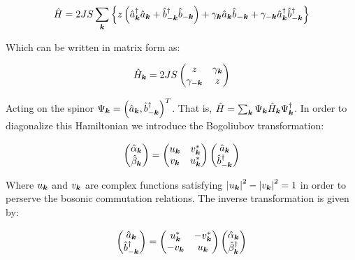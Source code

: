 \begin{equation}
\label{MagnonicH}
\hat{H} = 2JS \sum_{\boldsymbol{k}} \left\{ z \left( \hat{a}^\dagger_{\boldsymbol{k}}\hat{a}_{\boldsymbol{k}} + \hat{b}^\dagger_{-\boldsymbol{k}}\hat{b}_{-\boldsymbol{k}} \right) + \gamma_{\boldsymbol{k}}\hat{a}_{\boldsymbol{k}}\hat{b}_{\boldsymbol{-k}} + \gamma_{-\boldsymbol{k}}\hat{a}^\dagger_{\boldsymbol{k}}\hat{b}^\dagger_{-\boldsymbol{k}} \right\}
\end{equation}

Which can be written in matrix form as:

\begin{equation}
\hat{H}_{\boldsymbol{k}} = 2JS\begin{pmatrix} 
z & \gamma_{\boldsymbol{k}} \\
\gamma_{-\boldsymbol{k}} & z
\end{pmatrix}
\end{equation}

Acting on the spinor $\Psi_{\boldsymbol{k}} = \left(\hat{a}_{\boldsymbol{k}},\hat{b}_{-\boldsymbol{k}}^\dagger \right)^T$. That is, $\hat{H} = \sum_{\boldsymbol{k}} \Psi_{\boldsymbol{k}} \hat{H}_{\boldsymbol{k}} \Psi^\dagger_{\boldsymbol{k}}$. In order to diagonalize this Hamiltonian we introduce the Bogoliubov transformation:

\begin{equation}
\label{Bogoliubov}
\begin{pmatrix}
\hat{\alpha}_{\boldsymbol{k}} \\
\hat{\beta}_{\boldsymbol{k}}
\end{pmatrix} = 
\begin{pmatrix}
u_{\boldsymbol{k}} & v_{\boldsymbol{k}}^* \\
v_{\boldsymbol{k}} & u_{\boldsymbol{k}}^*
\end{pmatrix}
\begin{pmatrix}
\hat{a}_{\boldsymbol{k}} \\
\hat{b}_{-\boldsymbol{k}}^\dagger
\end{pmatrix}
\end{equation}

Where $u_{\boldsymbol{k}}$ and $v_{\boldsymbol{k}}$ are complex functions satisfying $\abs{u_{\boldsymbol{k}}}^2-\abs{v_{\boldsymbol{k}}}^2 = 1$ in order to perserve the bosonic commutation relations. The inverse transformation is given by:

\begin{equation}
\label{BogoliubovInv}
\begin{pmatrix}
\hat{a}_{\boldsymbol{k}} \\
\hat{b}_{-\boldsymbol{k}}^\dagger
\end{pmatrix} = 
\begin{pmatrix}
u_{\boldsymbol{k}}^* & -v_{\boldsymbol{k}}^* \\
-v_{\boldsymbol{k}} & u_{\boldsymbol{k}}
\end{pmatrix}
\begin{pmatrix}
\hat{\alpha}_{\boldsymbol{k}} \\
\hat{\beta}_{\boldsymbol{k}}^\dagger
\end{pmatrix}
\end{equation}

